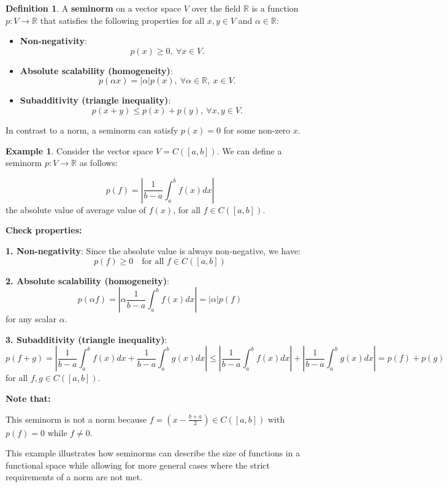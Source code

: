 \documentclass[12pt, reqno]{amsart}
\theoremstyle{definition}
\newtheorem{definition}[theorem]{Definition}
\newtheorem{example}[theorem]{Example}
\numberwithin{equation}{section}
\newcommand{\dR}{{\mathbb R}}
\begin{document}
\begin{definition}
    A \textbf{seminorm} on a vector space $V$ over the field $\dR$ is a function $p: V \to \dR$ that satisfies the following properties for all $x, y \in V$ and $\alpha \in \dR$:

\begin{itemize}
    \item \textbf{Non-negativity}: 
    $$ p(x) \geq 0, \ \forall x \in V. $$
    
    \item \textbf{Absolute scalability (homogeneity)}: 
    $$ p(\alpha x) = |\alpha| p(x), \ \forall \alpha \in \dR, \ x \in V. $$
    
    \item \textbf{Subadditivity (triangle inequality)}: 
    $$ p(x + y) \leq p(x) + p(y), \ \forall x, y \in V. $$
\end{itemize}

In contrast to a norm, a seminorm can satisfy $p(x) = 0$ for some non-zero $x$.

\end{definition}

\begin{example}
   Consider the vector space $V = C([a, b])$. We can define a seminorm $p: V \to \mathbb{R}$ as follows:

\[
p(f) = |\frac{1}{b-a} \int_a^b f(x) dx| 
\]
the absolute value of average value of $f(x)$,
for all $f \in C([a, b])$.

\textbf{Check properties:}

\textbf{1. Non-negativity}: Since the absolute value is always non-negative, we have:
   \[
   p(f) \geq 0 \quad \text{for all } f \in C([a, b])
   \]

\textbf{2. Absolute scalability (homogeneity)}:
   \[
   p(\alpha f) =|\alpha \frac{1}{b-a} \int_a^b f(x) dx|= |\alpha| p(f)
   \]
   for any scalar $\alpha$.

\textbf{3. Subadditivity (triangle inequality)}:
   \[
   p(f + g) =| \frac{1}{b-a} \int_a^b f(x) dx+ \frac{1}{b-a} \int_a^b g(x) dx|\leq | \frac{1}{b-a} \int_a^b f(x) dx| + |\frac{1}{b-a} \int_a^b g(x) dx|= p(f) + p(g)
   \]
   for all $f, g \in C([a, b])$.

\textbf{Note that:}

This seminorm is not a norm because %
$f=(x-\frac{b+a}{2}) \in C([a, b])$ with $p(f) = 0$ while $f \neq 0$. %

This example illustrates how seminorms can describe the size of functions in a functional space while allowing for more general cases where the strict requirements of a norm are not met.
\end{example}
\end{document}

